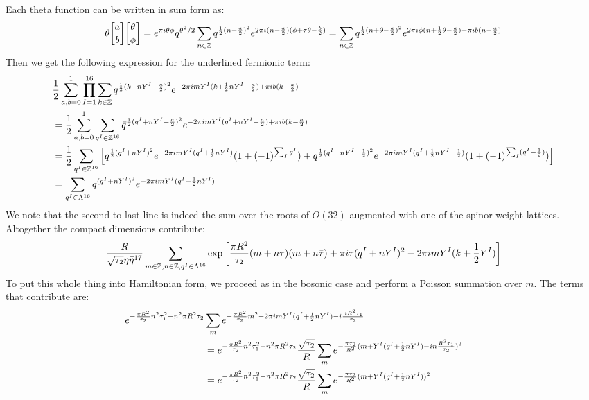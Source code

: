 \documentclass[11pt, class=article, crop=false]{standalone}
\begin{document}
\begin{enumerate}
		Each theta function can be written in sum form as: 
		\[
			\theta \twist ab \twist \theta \phi = e^{\pi i \theta \phi} q^{\theta^2/2} \sum_{n\in \ZZ} q^{\frac12 (n- \frac a2)^2} e^{2\pi i (n- \frac a2) (\phi + \tau \theta - \frac b2)} = \sum_{n \in \ZZ} q^{\frac12 (n + \theta - \frac a2)^2} e^{2\pi i  \phi (n + \frac12 \theta - \frac a2) - \pi i b (n- \frac a2)}
		\]
		Then we get the following expression for the underlined fermionic term: 
		\[
		\begin{aligned}
			&\frac12 \sum_{a,b=0}^1 \prod_{I = 1}^{16} \sum_{k\in \mathbb{Z}} \bar q^{\frac12 (k + n Y^I - \frac a2)^2} e^{-2\pi i m Y^I  (k + \frac12 n Y^I - \frac a2) + \pi i b (k- \frac a2)} \\
			&= \frac12 \sum_{a,b=0}^1
			 \sum_{q^I \in \mathbb{Z}^{16}} \bar q^{\frac12 (q^I + n Y^I - \frac a2)^2} e^{-2\pi i m Y^I  (q^I + n Y^I - \frac a2) + \pi i b (k- \frac a2)} \\
			&= \frac12 \sum_{q^I \in \mathbb{Z}^{16}} \left[ \bar q^{\frac12 (q^I + n Y^I)^2} e^{-2\pi i m Y^I  (q^I + \frac12 n Y^I) } (1 + (-1)^{\sum_I q^I})
			+ \bar q^{\frac12 (q^I + n Y^I- \frac12)^2} e^{-2\pi i m Y^I  (q^I + \frac12 n Y^I - \frac12) } (1 + (-1)^{\sum_I (q^I - \frac12)}) \right]\\
			&= \sum_{q^I \in \Lambda^{16}} q^{(q^I + n Y^I)^2} e^{-2 \pi i m Y^I (q^I + \frac12 n Y^I)}
		\end{aligned}
		\]
		We note that the second-to last line is indeed the sum over the roots of $O(32)$ augmented with one of the spinor weight lattices. Altogether the compact dimensions contribute:
		\[
			\frac{R}{\sqrt{\tau_2} \eta \bar \eta^{17}} \sum_{m\in \mathbb{Z},n \in \mathbb{Z} ,q^I \in \Lambda^{16}} \exp\left[\frac{\pi R^2}{\tau_2} (m + n \tau) (m + n \bar \tau) + \pi i \tau (q^I + n Y^I)^2 - 2 \pi i m Y^I (k + \frac12 Y^I) \right]
		\]
		To put this whole thing into Hamiltonian form, we proceed as in the bosonic case and perform a Poisson summation over $m$. The terms that contribute are:
		\[
		\hspace{-.3in}
		\begin{aligned}
			e^{-\frac{\pi R^2}{\tau_2} n^2 \tau_1^2 - n^2 \pi R^2 \tau_2}&\sum_{m} e^{-\frac{\pi R^2}{\tau_2} m^2 - 2\pi i m Y^I (q^I + \frac12 n Y^I)- i\frac{n R^2 \tau_1}{\tau_2}} \\
			&= e^{-\frac{\pi R^2}{\tau_2} n^2 \tau_1^2 - n^2 \pi R^2 \tau_2}\frac{\sqrt{\tau_2}}{R} \sum_{m} e^{-\frac{\pi \tau_2}{R^2} (m + Y^I (q^I + \frac12 n Y^I) - i n \frac{R^2 \tau_1}{\tau_2} )^2}\\
			&= e^{-\frac{\pi R^2}{\tau_2} n^2 \tau_1^2 - n^2 \pi R^2 \tau_2} \frac{\sqrt{\tau_2}}{R} \sum_{m} e^{-\frac{\pi \tau_2}{R^2} (m + Y^I (q^I + \frac12 n Y^I) )^2 
}
\end{aligned}\]
\end{enumerate}
\end{document}
